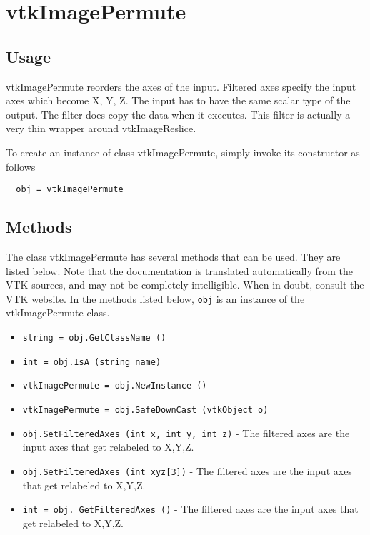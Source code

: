\section{vtkImagePermute}

\subsection{Usage}

 vtkImagePermute reorders the axes of the input. Filtered axes specify
 the input axes which become X, Y, Z.  The input has to have the
 same scalar type of the output. The filter does copy the 
 data when it executes. This filter is actually a very thin wrapper
 around vtkImageReslice.

To create an instance of class vtkImagePermute, simply
invoke its constructor as follows
\begin{verbatim}
  obj = vtkImagePermute
\end{verbatim}
\subsection{Methods}

The class vtkImagePermute has several methods that can be used.
  They are listed below.
Note that the documentation is translated automatically from the VTK sources,
and may not be completely intelligible.  When in doubt, consult the VTK website.
In the methods listed below, \verb|obj| is an instance of the vtkImagePermute class.
\begin{itemize}
\item  \verb|string = obj.GetClassName ()|

\item  \verb|int = obj.IsA (string name)|

\item  \verb|vtkImagePermute = obj.NewInstance ()|

\item  \verb|vtkImagePermute = obj.SafeDownCast (vtkObject o)|

\item  \verb|obj.SetFilteredAxes (int x, int y, int z)| -  The filtered axes are the input axes that get relabeled to X,Y,Z.

\item  \verb|obj.SetFilteredAxes (int xyz[3])| -  The filtered axes are the input axes that get relabeled to X,Y,Z.

\item  \verb|int = obj. GetFilteredAxes ()| -  The filtered axes are the input axes that get relabeled to X,Y,Z.

\end{itemize}
